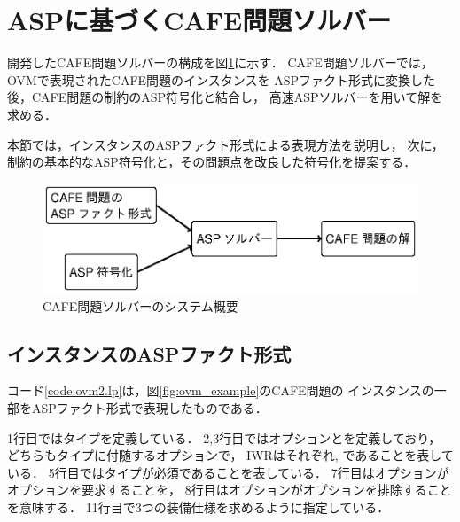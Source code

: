 \section{ASPに基づくCAFE問題ソルバー}

開発したCAFE問題ソルバーの構成を図\ref{fig:system}に示す．
CAFE問題ソルバーでは，OVMで表現されたCAFE問題のインスタンスを
ASPファクト形式に変換した後，CAFE問題の制約のASP符号化と結合し，
高速ASPソルバーを用いて解を求める．

本節では，インスタンスのASPファクト形式による表現方法を説明し，
次に，制約の基本的なASP符号化と，その問題点を改良した符号化を提案する．

\begin{figure}[tb]
 \includegraphics [width=\linewidth]{images/system.eps}
 \caption{CAFE問題ソルバーのシステム概要}
 \label{fig:system}
\end{figure}

\subsection{インスタンスのASPファクト形式}
 

コード\ref{code:ovm2.lp}は，図\ref{fig:ovm_example}のCAFE問題の
インスタンスの一部をASPファクト形式で表現したものである．

1行目ではタイプを定義している．
2,3行目ではオプションとを定義しており，
どちらもタイプに付随するオプションで，
IWRはそれぞれ, であることを表している．
5行目ではタイプが必須であることを表している．
7行目はオプションがオプションを要求することを，
8行目はオプションがオプションを排除することを意味する．
11行目で3つの装備仕様を求めるように指定している．

